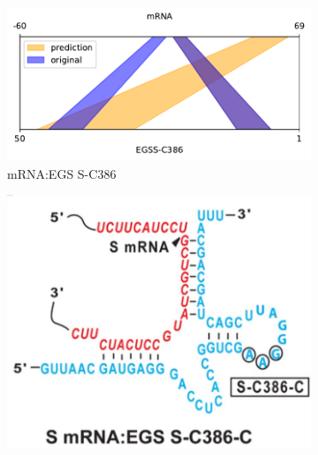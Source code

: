 \documentclass[twoside,a4paper]{report}
\begin{document}
\begin{figure}[h!tb]
\begin{subfigure}{.25\textwidth}
	 		\label{fig:SC386}
	 	\end{subfigure}%
 	\begin{subfigure}{.5\textwidth}
 		\centering
 		\includegraphics[width=.9\linewidth]{rricomparison4}
 		\caption{mRNA:EGS S-C386}
 		\label{fig:rricomparison4}
 	\end{subfigure}
	 	\begin{subfigure}{.25\textwidth}
	 		\centering
	 		\includegraphics[width=.9\linewidth]{sc386c}
	 	

\end{subfigure}
\end{figure}
\end{document}
